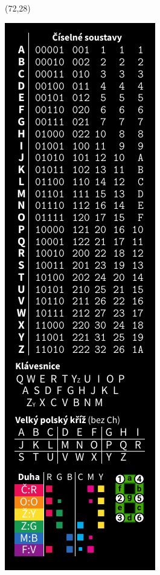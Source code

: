 \documentclass{extarticle}
\begin{document}
\begin{textblock}{42}(72,28)
\vfill
{\centerline{\includegraphics[scale=1,]{back.pdf}}} 
\vfill
\end{textblock}
\end{document}
